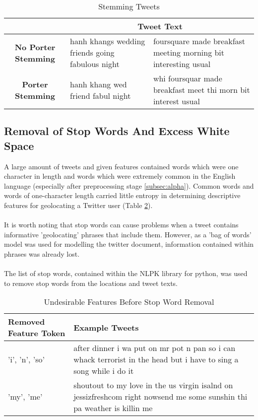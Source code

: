 \documentclass[11pt]{article}
\begin{document}
\begin{table} [h]
\caption{Stemming Tweets}
\begin{center}
	\begin{tabular}{| c | p{5.5cm} | p{5.5cm} |}
	\hline
	  & \multicolumn{2}{|c|}{\textbf{Tweet Text}}\\
	\hline
	\textbf{No Porter Stemming} &  hanh khangs wedding friends going fabulous night & foursquare made breakfast meeting morning bit interesting usual\\
	\hline
	\textbf{Porter Stemming}  & hanh khang wed friend fabul night & whi foursquar made breakfast meet thi morn bit interest usual\\
	\hline
	\end{tabular}
\end{center}
\label{table:stem-tweet}
\end{table}

\subsection{Removal of Stop Words And Excess White Space}
A large amount of tweets and given features contained words which were one character in length and words which were extremely common in the English language (especially after preprocessing stage \ref{subsec:alpha}). Common words and words of one-character length carried little entropy\citep{ra-stop} in determining descriptive features for geolocating a Twitter user (Table \ref{table:stop-words}).\\\\
It is worth noting that stop words can cause problems when a tweet contains informative 'geolocating' phrases that include them. However, as a 'bag of words' model was used for modelling the twitter document, information contained within phrases was already lost. \\\\
The list of stop words, contained within the NLPK library for python, was used to remove stop words from the locations and tweet texts.

\begin{table}[h]
	\centering
	\caption{Undesirable Features Before Stop Word Removal}
	\begin{tabular}{| l | p{12cm} |}
	\hline
	 \textbf{Removed Feature Token} & \textbf{Example Tweets}\\
	\hline
	'i', 'n', 'so' & after dinner i wa put on mr pot n pan  so i can whack terrorist in the head but i have to sing a song while i do it \\
	\hline
	'my', 'me'  & shoutout to my love in the us virgin isalnd on jessizfreshcom right nowsend me some sunshin thi pa weather is killin me\\
	\hline
	\end{tabular}
	\label{table:stop-words}
\end{table}
\end{document}
